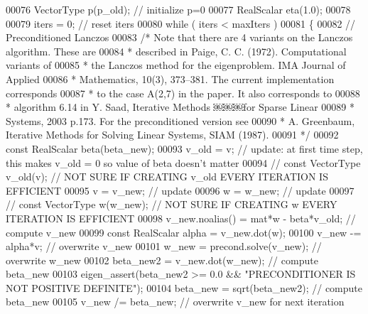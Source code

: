 \begin{DoxyCode}
00076             VectorType p(p\_old); \textcolor{comment}{// initialize p=0}
00077             RealScalar eta(1.0);
00078                         
00079             iters = 0; \textcolor{comment}{// reset iters}
00080             \textcolor{keywordflow}{while} ( iters < maxIters )
00081             \{
00082                 \textcolor{comment}{// Preconditioned Lanczos}
00083                 \textcolor{comment}{/* Note that there are 4 variants on the Lanczos algorithm. These are}
00084 \textcolor{comment}{                 * described in Paige, C. C. (1972). Computational variants of}
00085 \textcolor{comment}{                 * the Lanczos method for the eigenproblem. IMA Journal of Applied}
00086 \textcolor{comment}{                 * Mathematics, 10(3), 373–381. The current implementation corresponds }
00087 \textcolor{comment}{                 * to the case A(2,7) in the paper. It also corresponds to }
00088 \textcolor{comment}{                 * algorithm 6.14 in Y. Saad, Iterative Methods ￼￼￼for Sparse Linear}
00089 \textcolor{comment}{                 * Systems, 2003 p.173. For the preconditioned version see }
00090 \textcolor{comment}{                 * A. Greenbaum, Iterative Methods for Solving Linear Systems, SIAM (1987).}
00091 \textcolor{comment}{                 */}
00092                 \textcolor{keyword}{const} RealScalar beta(beta\_new);
00093                 v\_old = v; \textcolor{comment}{// update: at first time step, this makes v\_old = 0 so value of beta doesn't
       matter}
00094 \textcolor{comment}{//                const VectorType v\_old(v); // NOT SURE IF CREATING v\_old EVERY ITERATION IS EFFICIENT}
00095                 v = v\_new; \textcolor{comment}{// update}
00096                 w = w\_new; \textcolor{comment}{// update}
00097 \textcolor{comment}{//                const VectorType w(w\_new); // NOT SURE IF CREATING w EVERY ITERATION IS EFFICIENT}
00098                 v\_new.noalias() = mat*w - beta*v\_old; \textcolor{comment}{// compute v\_new}
00099                 \textcolor{keyword}{const} RealScalar alpha = v\_new.dot(w);
00100                 v\_new -= alpha*v; \textcolor{comment}{// overwrite v\_new}
00101                 w\_new = precond.solve(v\_new); \textcolor{comment}{// overwrite w\_new}
00102                 beta\_new2 = v\_new.dot(w\_new); \textcolor{comment}{// compute beta\_new}
00103                 eigen\_assert(beta\_new2 >= 0.0 && \textcolor{stringliteral}{"PRECONDITIONER IS NOT POSITIVE DEFINITE"});
00104                 beta\_new = sqrt(beta\_new2); \textcolor{comment}{// compute beta\_new}
00105                 v\_new /= beta\_new; \textcolor{comment}{// overwrite v\_new for next iteration}

\end{DoxyCode}
